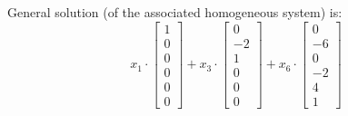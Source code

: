 \documentclass{article}
\begin{document}
General solution (of the associated homogeneous system) is:
\[ x_1 \cdot \left[\begin{array}{c}
     1\\
     0\\
     0\\
     0\\
     0\\
     0
   \end{array}\right] + x_3 \cdot \left[\begin{array}{c}
     0\\
     - 2\\
     1\\
     0\\
     0\\
     0
   \end{array}\right] + x_6 \cdot \left[\begin{array}{c}
     0\\
     - 6\\
     0\\
     - 2\\
     4\\
     1
   \end{array}\right] \]
\end{document}
